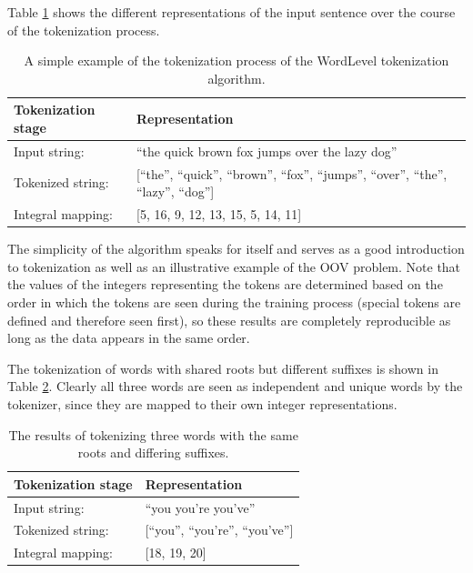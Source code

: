 \documentclass[12pt]{article}
\begin{document}
Table \ref{tab:wordlevel_tokenization_example} shows the different representations of the input sentence over the course of the tokenization process.

\begin{table}[!t]
    \centering
    \begin{tabular}{l l}
        \toprule
        Tokenization stage & Representation                                                                            \\
        \midrule
        Input string:      & ``the quick brown fox jumps over the lazy dog''                                           \\
        Tokenized string:  & [``the'', ``quick'', ``brown'', ``fox'', ``jumps'', ``over'', ``the'', ``lazy'', ``dog''] \\
        Integral mapping:  & [5, 16, 9, 12, 13, 15, 5, 14, 11]                                                         \\
        \bottomrule
    \end{tabular}
    \caption{A simple example of the tokenization process of the WordLevel tokenization algorithm.}
    \label{tab:wordlevel_tokenization_example}
\end{table}

The simplicity of the algorithm speaks for itself and serves as a good introduction to tokenization as well as an illustrative example of the OOV
problem. Note that the values of the integers representing the tokens are determined based on the order in which the tokens are seen during the
training process (special tokens are defined and therefore seen first), so these results are completely reproducible as long as the data appears in
the same order.

The tokenization of words with shared roots but different suffixes is shown in Table \ref{tab:wordlevel_tokenization_shared_roots_example}. Clearly
all three words are seen as independent and unique words by the tokenizer, since they are mapped to their own integer representations.

\begin{table}[!t]
    \centering
    \begin{tabular}{l l}
        \toprule
        Tokenization stage & Representation                    \\
        \midrule
        Input string:      & ``you you're you've''             \\
        Tokenized string:  & [``you'', ``you're'', ``you've''] \\
        Integral mapping:  & [18, 19, 20]                      \\
        \bottomrule
    \end{tabular}
    \caption{The results of tokenizing three words with the same roots and differing suffixes.}
    \label{tab:wordlevel_tokenization_shared_roots_example}
\end{table}
\end{document}

